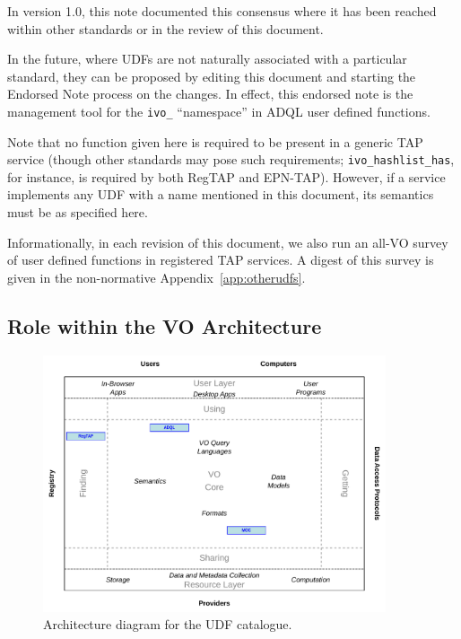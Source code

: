 \documentclass[11pt,a4paper]{ivoa}
\begin{document}
In version 1.0, this note documented this consensus where it has been
reached within other standards or in the review of this document.  

In the future, where UDFs are not naturally associated with a
particular standard, they can be proposed by editing this document and
starting the Endorsed Note process \citep{2017ivoa.spec.0517G} on the
changes.  In effect, this endorsed note is the management tool for
the \verb|ivo_| ``namespace'' in ADQL user defined functions.

Note that no function given here is required to be present in a generic
TAP service (though other standards may pose such requirements;
\verb|ivo_hashlist_has|, for instance, is required by both
RegTAP and EPN-TAP).  However, if a service implements any UDF with a
name mentioned in this document, its semantics must be as specified here.

Informationally, in each revision of this document, we also run an
all-VO survey of user defined functions in registered TAP services.  A
digest of this survey is given in the non-normative
Appendix~\ref{app:otherudfs}.

\subsection{Role within the VO Architecture}

\begin{figure}
\centering

\includegraphics[width=0.9\textwidth]{role_diagram.pdf}
\caption{Architecture diagram for the UDF catalogue.}
\label{fig:archdiag}
\end{figure}
\end{document}
